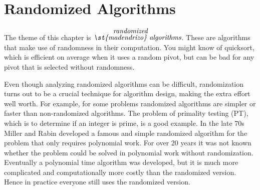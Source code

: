 \chapter{Randomized Algorithms}
\label{ch:randomized}
\label{ch:randomization}
{ 

\newcommand{\qsort}{quicksort}
\newcommand{\Qsort}{Quicksort}

\newcommand{\SSpace}{\ensuremath{\Omega}}
\newcommand{\EventE}{\mathcal{E}}

The theme of this chapter is $\overset{\mbox{\em
    randomized}~~~~~~}{\mbox{\em \st{madendrizo} algorithms}}$.  These are
algorithms that make use of randomness in their computation.  You
might know of \qsort, which is efficient on average when it uses a
random pivot, but can be bad for any pivot that is selected without
randomness.

Even though analyzing randomized algorithms can be difficult,
randomization turns out to be a crucial technique for algorithm
design, making the extra effort well worth. 
%
For example, for some problems randomized algorithms are simpler or
faster than non-randomized algorithms. 
%
The problem of primality testing (PT), which is to determine if an
integer is prime, is a good example.  In the late 70s Miller and Rabin
developed a famous and simple randomized algorithm for the problem
that only requires polynomial work.  For over 20 years it was not
known whether the problem could be solved in polynomial work without
randomization.  Eventually a polynomial time algorithm was developed,
but it is much more complicated and computationally more costly than
the randomized version.  Hence in practice everyone still uses the
randomized version.

\begin{comment}
fun checkPrime(n, k) = 
let
     fun sAndD (s,d) =
       if isOdd(d) then (s,d)
       else sAndD(s+1,d/2)
     val (s,d) = sAndD(0,n)

     fun sample(k) = 
       if (k = 0) then ProbPrime 
       else let
         val a = random(2,n-2)
         val x = a^d \mod n
         fun trySquares(x,s) =
             if (x = 1 orelse s = 0) then Composite
             else if (x = n -1) then ProbPrime
             else trySquares(x^2 \mod n,s-1)
       in
          if (x = 1 orelse x = n-1) then sample(k-1)
          else if (try(x,s-1) = ProbPrime) then sample(k-1)
          else Composite
       end
in
     sample(k)
end
\end{comment}

}
